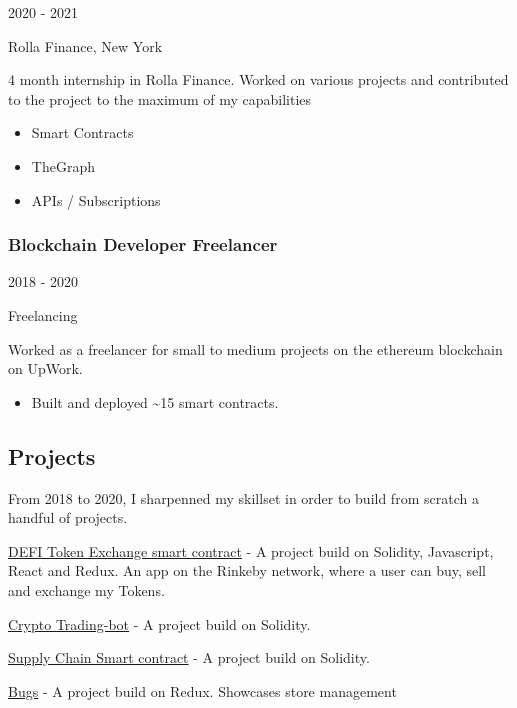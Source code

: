\documentclass[
  english,
]{article}
\providecommand{\tightlist}{%
  \setlength{\itemsep}{0pt}\setlength{\parskip}{0pt}}
\begin{document}
2020 - 2021

Rolla Finance, New York

4 month internship in Rolla Finance. Worked on various projects and
contributed to the project to the maximum of my capabilities

\begin{itemize}
\tightlist
\item
  Smart Contracts
\item
  TheGraph
\item
  APIs / Subscriptions
\end{itemize}

\hypertarget{blockchain-developer-freelancer}{%
\subsubsection{Blockchain Developer
Freelancer}\label{blockchain-developer-freelancer}}

2018 - 2020

Freelancing

Worked as a freelancer for small to medium projects on the ethereum
blockchain on UpWork.

\begin{itemize}
\tightlist
\item
  Built and deployed \textasciitilde15 smart contracts.
\end{itemize}

\hypertarget{projects}{%
\subsection{\texorpdfstring{{ \emph{} \emph{} }
Projects}{    Projects}}\label{projects}}

From 2018 to 2020, I sharpenned my skillset in order to build from
scratch a handful of projects.

{ \href{https://github.com/CptMike/TokenExchangeFullstack}{DEFI Token
Exchange smart contract} } - {A project build on Solidity, Javascript,
React and Redux. An app on the Rinkeby network, where a user can buy,
sell and exchange my Tokens.}

{ \href{https://github.com/CptMike/trading-bot}{Crypto Trading-bot} } -
{A project build on Solidity.}

{ \href{https://github.com/CptMike/supply-chain}{Supply Chain Smart
contract} } - {A project build on Solidity.}

{ \href{https://github.com/CptMike/Bugs}{Bugs} } - {A project build on
Redux. Showcases store management}
\end{document}
